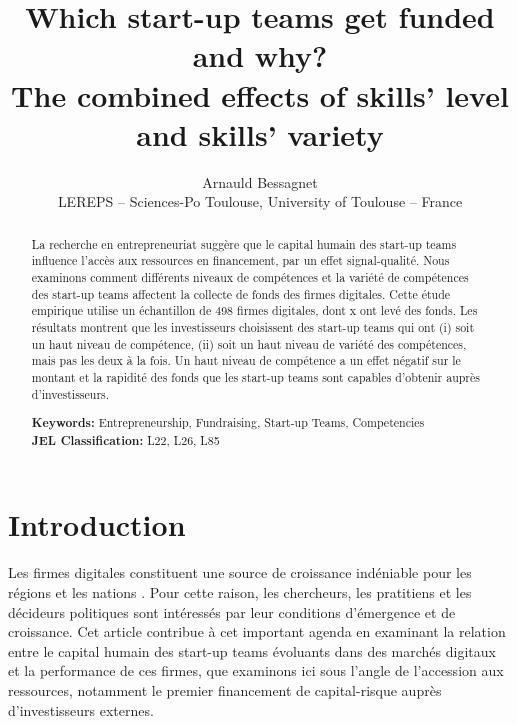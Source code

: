 \documentclass[12pt]{article}
\begin{document}
\title{Which start-up teams get funded and why? \\ The combined effects of skills' level and skills' variety}
\date{\vspace{-3ex}}
\author{Arnauld Bessagnet \\ \footnotesize{LEREPS – Sciences-Po Toulouse, University of Toulouse – France} \\}

\maketitle \vspace{-1,5em}

\begin{abstract}
\noindent
La recherche en entrepreneuriat suggère que le capital humain des start-up teams influence l'accès aux ressources en financement, par un effet signal-qualité. Nous examinons comment différents niveaux de compétences et la variété de compétences des start-up teams affectent la collecte de fonds des firmes digitales. Cette étude empirique utilise un échantillon de 498 firmes digitales, dont x ont levé des fonds. Les résultats montrent que les investisseurs choisissent des start-up teams qui ont (i) soit un haut niveau de compétence, (ii) soit un haut niveau de variété des compétences, mais pas les deux à la fois. Un haut niveau de compétence a un effet négatif sur le montant et la rapidité des fonds que les start-up teams sont capables d'obtenir auprès d'investisseurs.
\newline

\begin{obeylines}
\noindent \footnotesize{}{\textbf{Keywords:} Entrepreneurship, Fundraising, Start-up Teams, Competencies}
\noindent \footnotesize{\textbf{JEL Classification:} L22, L26, L85}
\end{obeylines}

\end{abstract}

\clearpage
\section{Introduction}

Les firmes digitales constituent une source de croissance indéniable pour les régions et les nations \citep{acs2021evolution}. Pour cette raison, les chercheurs, les pratitiens et les décideurs politiques sont intéressés par leur conditions d'émergence et de croissance. Cet article contribue à cet important agenda en examinant la relation entre le capital humain des start-up teams évoluants dans des marchés digitaux et la performance de ces firmes, que examinons ici sous l'angle de l'accession aux ressources, notamment le premier financement de capital-risque auprès d'investisseurs externes.
\end{document}
